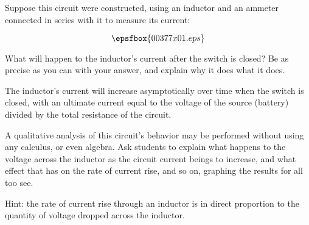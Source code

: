 

Suppose this circuit were constructed, using an inductor and an ammeter connected in series with it to measure its current:

$$\epsfbox{00377x01.eps}$$

What will happen to the inductor's current after the switch is closed?  Be as precise as you can with your answer, and explain why it does what it does.

\vskip 30pt







The inductor's current will increase asymptotically over time when the switch is closed, with an ultimate current equal to the voltage of the source (battery) divided by the total resistance of the circuit.







A qualitative analysis of this circuit's behavior may be performed without using any calculus, or even algebra.  Ask students to explain what happens to the voltage across the inductor as the circuit current beings to increase, and what effect that has on the rate of current rise, and so on, graphing the results for all too see.

Hint: the rate of current rise through an inductor is in direct proportion to the quantity of voltage dropped across the inductor.




